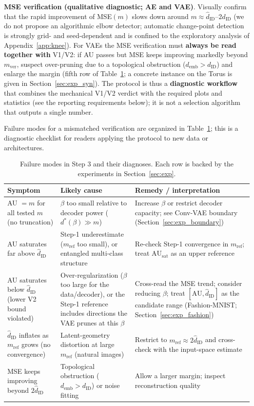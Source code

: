 \documentclass[make,article,submit,pdftex,moreauthors]{Definitions/mdpi}
\newcommand{\dID}{d_{\mathrm{ID}}}
\newcommand{\hatdID}{\hat{d}_{\mathrm{ID}}}
\newcommand{\AUsat}{\mathrm{AU}_{\mathrm{sat}}}
\newcommand{\demb}{d_{\mathrm{emb}}}
\newcommand{\dstar}{d^{*}(\beta)}
\begin{document}
\textbf{MSE verification (qualitative diagnostic; AE and VAE)}.
Visually confirm that the rapid improvement of MSE$(m)$ slows down
around $m \approx \hatdID$--$2\hatdID$ (we do not propose an
algorithmic elbow detector; automatic change-point detection is
strongly grid- and seed-dependent and is confined to the exploratory
analysis of Appendix~\ref{app:knee}).
For VAEs the MSE verification must \textbf{always be read together with}
V1/V2: if AU passes but MSE keeps improving markedly beyond
$m_{\mathrm{ver}}$, suspect over-pruning due to a topological obstruction
($\demb > \dID$) and enlarge the margin (fifth row of
Table~\ref{tab:failure}; a concrete instance on the Torus is given in
Section~\ref{sec:exp_syn}).
The protocol is thus a \textbf{diagnostic workflow} that combines the
mechanical V1/V2 verdict with the required plots and statistics (see the
reporting requirements below); it is not a selection algorithm that outputs
a single number.

Failure modes for a mismatched verification are organized in
Table~\ref{tab:failure}; this is a diagnostic checklist for readers applying
the protocol to new data or architectures.

\begin{table}[H]
\caption{Failure modes in Step 3 and their diagnoses. Each row is backed by
the experiments in Section~\ref{sec:exp}.}
\label{tab:failure}
\small
\begin{tabular}{p{3.9cm}p{4.3cm}p{4.3cm}}
\toprule
\textbf{Symptom} & \textbf{Likely cause} & \textbf{Remedy / interpretation} \\
\midrule
AU $= m$ for all tested $m$ (no truncation) & $\beta$ too small relative to decoder power ($\dstar \gg m$) & Increase $\beta$ or restrict decoder capacity; see Conv-VAE boundary (Section~\ref{sec:exp_boundary}) \\
AU saturates far above $\hatdID$ & Step-1 underestimate ($m_{\mathrm{ref}}$ too small), or entangled multi-class structure & Re-check Step-1 convergence in $m_{\mathrm{ref}}$; treat $\AUsat$ as an upper reference \\
AU saturates below $\hatdID$ (lower V2 bound violated) & Over-regularization ($\beta$ too large for the data/decoder), or the Step-1 reference includes directions the VAE prunes at this $\beta$ & Cross-read the MSE trend; consider reducing $\beta$; treat $[\mathrm{AU}, \hatdID]$ as the candidate range (Fashion-MNIST; Section~\ref{sec:exp_fashion}) \\
$\hatdID$ inflates as $m_{\mathrm{ref}}$ grows (no convergence) & Latent-geometry distortion at large $m_{\mathrm{ref}}$ (natural images) & Restrict to $m_{\mathrm{ref}} \approx 2\hatdID$ and cross-check with the input-space estimate \\
MSE keeps improving beyond $2\hatdID$ & Topological obstruction ($\demb > \dID$) or noise fitting & Allow a larger margin; inspect reconstruction quality \\
\bottomrule
\end{tabular}
\end{table}
\end{document}
